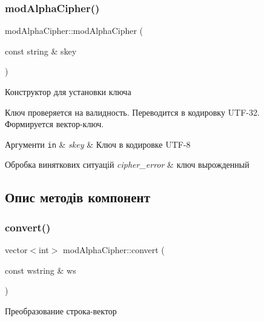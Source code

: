 \subsubsection{\texorpdfstring{mod\+Alpha\+Cipher()}{modAlphaCipher()}\hspace{0.1cm}{\footnotesize\ttfamily [2/2]}}
{\footnotesize\ttfamily mod\+Alpha\+Cipher\+::mod\+Alpha\+Cipher (\begin{DoxyParamCaption}\item[{const string \&}]{skey }\end{DoxyParamCaption})}



Конструктор для установки ключа 

Ключ проверяется на валидность. Переводится в кодировку U\+T\+F-\/32. Формируется вектор-\/ключ. 
\begin{DoxyParams}[1]{Аргументи}
\mbox{\tt in}  & {\em skey} & Ключ в кодировке U\+T\+F-\/8 \\
\hline
\end{DoxyParams}

\begin{DoxyExceptions}{Обробка виняткових ситуацій}
{\em cipher\+\_\+error} & ключ вырожденный \\
\hline
\end{DoxyExceptions}


\subsection{Опис методів компонент}
\mbox{\label{classmodAlphaCipher_ad08ba0004ee53526e9110ff20daffb90}} 
\subsubsection{\texorpdfstring{convert()}{convert()}\hspace{0.1cm}{\footnotesize\ttfamily [1/2]}}
{\footnotesize\ttfamily vector$<$int$>$ mod\+Alpha\+Cipher\+::convert (\begin{DoxyParamCaption}\item[{const wstring \&}]{ws }\end{DoxyParamCaption})\hspace{0.3cm}{\ttfamily [private]}}



Преобразование строка-\/вектор 


